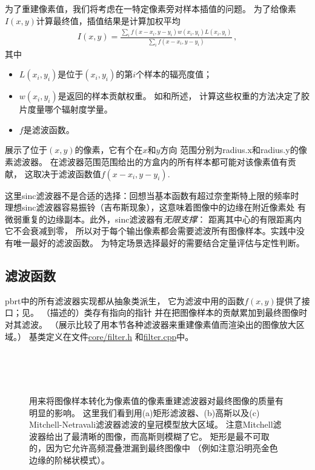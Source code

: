 为了重建像素值，我们将考虑在一特定像素旁对样本插值的问题。
为了给像素$I(x,y)$计算最终值，插值结果是计算加权平均
\begin{align}\label{eq:7.12}
    I(x,y)=\frac{\sum\limits_i {f(x-x_i,y-y_i)w(x_i,y_i)L(x_i,y_i)}}{\sum\limits_i {f(x-x_i,y-y_i)}}\, ,
\end{align}
其中
\begin{itemize}
    \item $L(x_i,y_i)$是位于$(x_i,y_i)$的第$i$个样本的辐亮度值；
    \item $w(x_i,y_i)$是返回的样本贡献权重。
          如和所述，
          计算这些权重的方法决定了胶片度量哪个辐射度学量。
    \item $f$是滤波函数。
\end{itemize}

展示了位于$(x,y)$的像素，它有个在$x$和$y$方向
范围分别为{\ttfamily radius.x}和{\ttfamily radius.y}的像素滤波器。
在滤波器范围范围给出的方盒内的所有样本都可能对该像素值有贡献，
这取决于滤波函数值$f(x-x_i,y-y_i)$.

这里sinc滤波器不是合适的选择：回想当基本函数有超过奈奎斯特上限的频率时
理想sinc滤波器容易振铃（吉布斯现象），这意味着图像中的边缘在附近像素处
有微弱重复的边缘副本。此外，sinc滤波器有\emph{无限支撑}：
距离其中心的有限距离内它不会衰减到零，
所以对于每个输出像素都会需要滤波所有图像样本。实践中没有唯一最好的滤波函数。
为特定场景选择最好的需要结合定量评估与定性判断。

\subsection{滤波函数}\label{sub:滤波函数}
pbrt中的所有滤波器实现都从抽象类派生，
它为滤波中用的函数$f(x,y)$提供了接口；见。
（描述的）类存有指向的指针
并在把图像样本的贡献累加到最终图像时对其滤波。
（展示比较了用本节各种滤波器来重建像素值而渲染出的图像放大区域。）
基类定义在文件\href{https://github.com/mmp/pbrt-v3/blob/master/src/core/filter.h}{\ttfamily core/filter.h}
和\href{https://github.com/mmp/pbrt-v3/blob/master/src/core/filter.cpp}{\ttfamily filter.cpp}中。
\begin{figure}[htbp]
    \centering
    \\
    \\
    \\
    \caption{用来将图像样本转化为像素值的像素重建滤波器对最终图像的质量有明显的影响。
        这里我们看到用(a)矩形滤波器、(b)高斯以及(c) Mitchell-Netravali滤波器滤波的皇冠模型放大区域。
        注意Mitchell滤波器给出了最清晰的图像，而高斯则模糊了它。
        矩形是最不可取的，因为它允许高频混叠泄漏到最终图像中
        （例如注意沿明亮金色边缘的阶梯状模式）。}
    \label{fig:7.39}
\end{figure}

